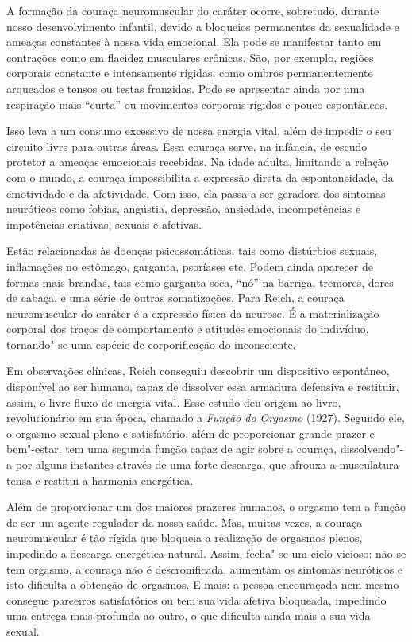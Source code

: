 A formação da couraça neuromuscular do caráter ocorre, sobretudo,
durante nosso desenvolvimento infantil, devido a bloqueios permanentes
da sexualidade e ameaças constantes à nossa vida emocional. Ela pode se
manifestar tanto em contrações como em flacidez musculares crônicas.
São, por exemplo, regiões corporais constante e intensamente rígidas,
como ombros permanentemente arqueados e tensos ou testas franzidas. Pode
se apresentar ainda por uma respiração mais ``curta'' ou movimentos
corporais rígidos e pouco espontâneos.

Isso leva a um consumo excessivo de nossa energia vital, além de impedir
o seu circuito livre para outras áreas. Essa couraça serve, na infância,
de escudo protetor a ameaças emocionais recebidas. Na idade adulta,
limitando a relação com o mundo, a couraça impossibilita a expressão
direta da espontaneidade, da emotividade e da afetividade. Com isso, ela
passa a ser geradora dos sintomas neuróticos como fobias, angústia,
depressão, ansiedade, incompetências e impotências criativas, sexuais e
afetivas.

Estão relacionadas às doenças psicossomáticas, tais como distúrbios
sexuais, inflamações no estômago, garganta, psoríases etc. Podem ainda
aparecer de formas mais brandas, tais como garganta seca, ``nó'' na
barriga, tremores, dores de cabaça, e uma série de outras somatizações.
Para Reich, a couraça neuromuscular do caráter é a expressão física da
neurose. É a materialização corporal dos traços de comportamento e
atitudes emocionais do indivíduo, tornando"-se uma espécie de
corporificação do inconsciente.

Em observações clínicas, Reich conseguiu descobrir um dispositivo
espontâneo, disponível ao ser humano, capaz de dissolver essa armadura
defensiva e restituir, assim, o livre fluxo de energia vital. Esse
estudo deu origem ao livro, revolucionário em sua época, chamado a
\emph{Função do Orgasmo} (1927). Segundo ele, o orgasmo sexual pleno e
satisfatório, além de proporcionar grande prazer e bem"-estar, tem uma
segunda função capaz de agir sobre a couraça, dissolvendo"-a por alguns
instantes através de uma forte descarga, que afrouxa a musculatura tensa
e restitui a harmonia energética.

Além de proporcionar um dos maiores prazeres humanos, o orgasmo tem a
função de ser um agente regulador da nossa saúde. Mas, muitas vezes, a
couraça neuromuscular é tão rígida que bloqueia a realização de orgasmos
plenos, impedindo a descarga energética natural. Assim, fecha"-se um
ciclo vicioso: não se tem orgasmo, a couraça não é descronificada,
aumentam os sintomas neuróticos e isto dificulta a obtenção de orgasmos.
E mais: a pessoa encouraçada nem mesmo consegue parceiros satisfatórios
ou tem sua vida afetiva bloqueada, impedindo uma entrega mais profunda
ao outro, o que dificulta ainda mais a sua vida sexual.

